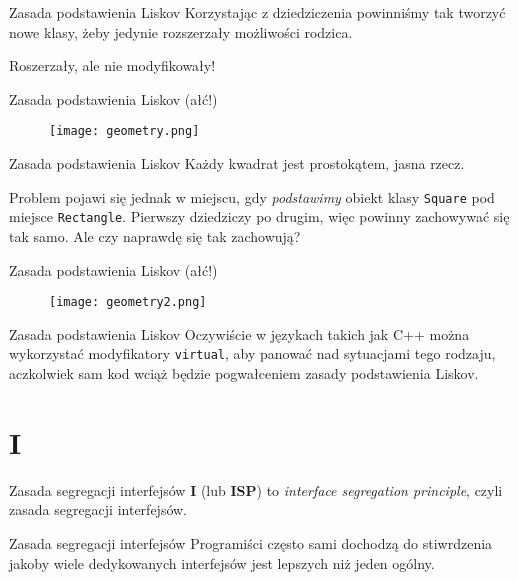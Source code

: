 \begin{frame}{Zasada podstawienia Liskov}
	Korzystając z dziedziczenia powinniśmy tak tworzyć nowe klasy, żeby jedynie rozszerzały możliwości rodzica.
	
	Roszerzały, ale nie modyfikowały!
\end{frame}

\begin{frame}{Zasada podstawienia Liskov (ałć!)}
	\begin{figure} \centering
		\texttt{[image: geometry.png]}
	\end{figure}
\end{frame}

\begin{frame}{Zasada podstawienia Liskov}
	Każdy kwadrat jest prostokątem, jasna rzecz.
	
	Problem pojawi się jednak w miejscu, gdy \emph{podstawimy} obiekt klasy \texttt{Square} pod miejsce \texttt{Rectangle}. Pierwszy dziedziczy po drugim, więc powinny zachowywać się tak samo. Ale czy naprawdę się tak zachowują?
\end{frame}

\begin{frame}{Zasada podstawienia Liskov (ałć!)}
	\begin{figure} \centering
		\texttt{[image: geometry2.png]}
	\end{figure}
\end{frame}

\begin{frame}{Zasada podstawienia Liskov}
	Oczywiście w językach takich jak C++ można wykorzystać modyfikatory \texttt{virtual}, aby panować nad sytuacjami tego rodzaju, aczkolwiek sam kod wciąż będzie pogwałceniem zasady podstawienia Liskov.
\end{frame}

\section{I}

\begin{frame}{Zasada segregacji interfejsów}
	\textbf{I} (lub \textbf{ISP}) to \emph{interface segregation principle}, czyli zasada segregacji interfejsów.
\end{frame}

\begin{frame}{Zasada segregacji interfejsów}
	Programiści często sami dochodzą do stiwrdzenia jakoby wiele dedykowanych interfejsów jest lepszych niż jeden ogólny.
\end{frame}

